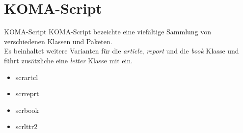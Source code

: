 \section{KOMA-Script}

\begin{frame}{KOMA-Script}
  KOMA-Script bezeichte eine viefältige Sammlung von verschiedenen Klassen und Paketen.\\
  Es beinhaltet weitere Varianten für die \emph{article}, \emph{report} und die \emph{book} Klasse
  und führt zusätzliche eine \emph{letter} Klasse mit ein.\\

  \begin{itemize}
    \item scrartcl
    \item scrreprt
    \item scrbook
    \item scrlttr2
  \end{itemize}
\end{frame}
